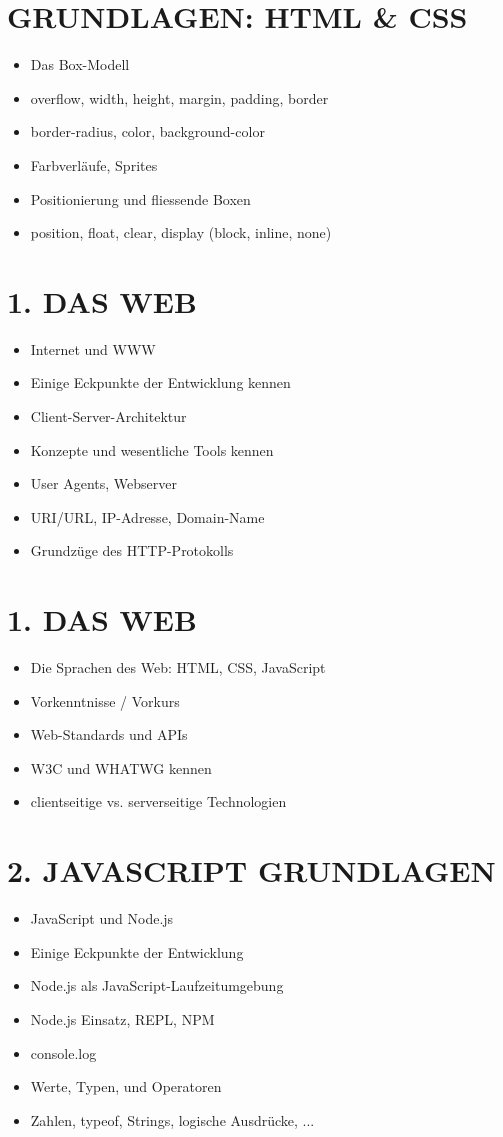\section*{GRUNDLAGEN: HTML \& CSS}
\begin{itemize}
  \item Das Box-Modell
  \item overflow, width, height, margin, padding, border
  \item border-radius, color, background-color
  \item Farbverläufe, Sprites
  \item Positionierung und fliessende Boxen
  \item position, float, clear, display (block, inline, none)
\end{itemize}

\section*{1. DAS WEB}
\begin{itemize}
  \item Internet und WWW
  \item Einige Eckpunkte der Entwicklung kennen
  \item Client-Server-Architektur
  \item Konzepte und wesentliche Tools kennen
  \item User Agents, Webserver
  \item URI/URL, IP-Adresse, Domain-Name
  \item Grundzüge des HTTP-Protokolls
\end{itemize}

\section*{1. DAS WEB}
\begin{itemize}
  \item Die Sprachen des Web: HTML, CSS, JavaScript
  \item Vorkenntnisse / Vorkurs
  \item Web-Standards und APIs
  \item W3C und WHATWG kennen
  \item clientseitige vs. serverseitige Technologien
\end{itemize}

\section*{2. JAVASCRIPT GRUNDLAGEN}
\begin{itemize}
  \item JavaScript und Node.js
  \item Einige Eckpunkte der Entwicklung
  \item Node.js als JavaScript-Laufzeitumgebung
  \item Node.js Einsatz, REPL, NPM
  \item console.log
  \item Werte, Typen, und Operatoren
  \item Zahlen, typeof, Strings, logische Ausdrücke, ...
\end{itemize}

